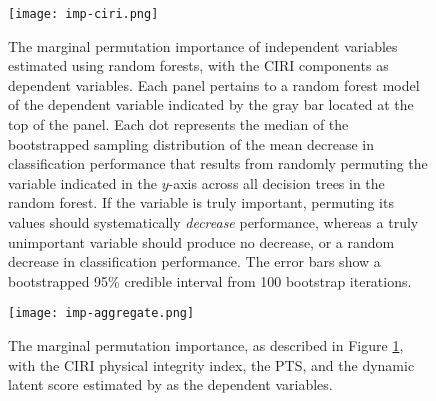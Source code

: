 \documentclass[11pt]{article}
\begin{document}
\begin{figure}[!htpb]
\centering
\texttt{[image: imp-ciri.png]}
\caption{The marginal permutation importance of independent variables estimated using random forests, with the CIRI components as dependent variables. Each panel pertains to a random forest model of the dependent variable indicated by the gray bar located at the top of the panel. Each dot represents the median of the bootstrapped sampling distribution of the mean decrease in classification performance that results from randomly permuting the variable indicated in the $y$-axis across all decision trees in the random forest. If the variable is truly important, permuting its values should systematically \textit{decrease} performance, whereas a truly unimportant variable should produce no decrease, or a random decrease in classification performance. The error bars show a bootstrapped 95\% credible interval from 100 bootstrap iterations.}
\label{fig:imp-ciri}
\end{figure}

\begin{figure}[!htpb]
\centering
\texttt{[image: imp-aggregate.png]}
\caption{The marginal permutation importance, as described in Figure \ref{fig:imp-ciri}, with the CIRI physical integrity index, the PTS, and the dynamic latent score estimated by \citet{Fariss2013} as the dependent variables.}
\label{fig:imp-aggregate}
\end{figure}
\end{document}
